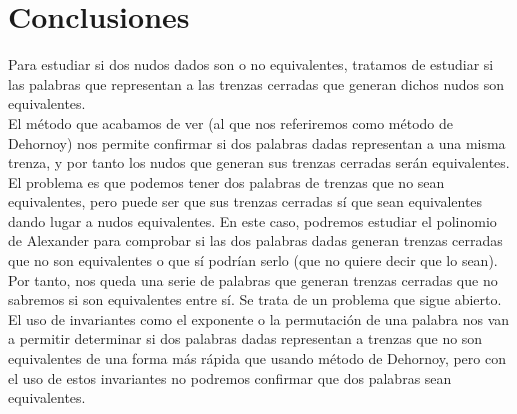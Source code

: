 \newpage
\section{Conclusiones}
Para estudiar si dos nudos dados son o no equivalentes, tratamos de estudiar si las palabras que representan a las trenzas cerradas que generan dichos nudos son equivalentes. \\

El método que acabamos de ver (al que nos referiremos como método de Dehornoy) nos permite confirmar si dos palabras dadas representan a una misma trenza, y por tanto los nudos que generan sus trenzas cerradas serán equivalentes.\\

El problema es que podemos tener dos palabras de trenzas que no sean equivalentes, pero puede ser que sus trenzas cerradas sí que sean equivalentes dando lugar a nudos equivalentes. En este caso, podremos estudiar el polinomio de Alexander para comprobar si las dos palabras dadas generan trenzas cerradas que no son equivalentes o que sí podrían serlo (que no quiere decir que lo sean).\\

Por tanto, nos queda una serie de palabras que generan trenzas cerradas que no sabremos si son equivalentes entre sí. Se trata de un problema que sigue abierto. \\

El uso de invariantes como el exponente o la permutación de una palabra nos van a permitir determinar si dos palabras dadas representan a trenzas que no son equivalentes de una forma más rápida que usando método de Dehornoy, pero con el uso de estos invariantes no podremos confirmar que dos palabras sean equivalentes.\\ 

